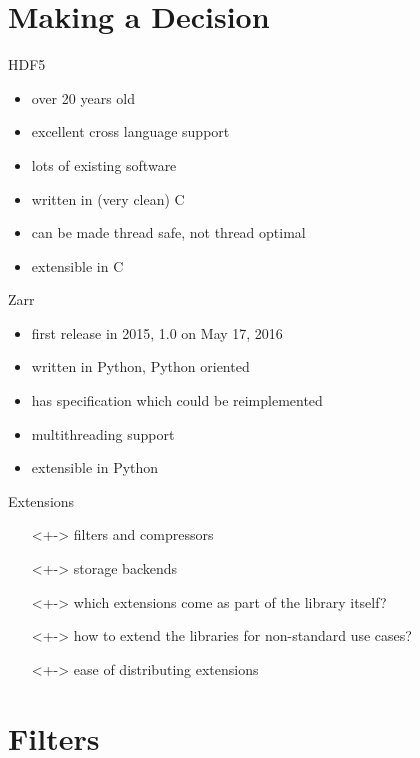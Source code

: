 \documentclass{beamer}
\begin{document}
\section{Making a Decision}

\begin{frame}{HDF5}
  \begin{itemize}
  \item<+-> over 20 years old
  \item<+-> excellent cross language support
  \item<+-> lots of existing software
  \item<+-> written in (very clean) C
  \item<+-> can be made thread safe, not thread optimal
  \item<+-> extensible in C
  \end{itemize}
\end{frame}

\begin{frame}{Zarr}
  \begin{itemize}
  \item<+-> first release in 2015, 1.0 on May 17, 2016
  \item<+-> written in Python, Python oriented
  \item<+-> has specification which could be reimplemented
  \item<+-> multithreading support
  \item<+-> extensible in Python
  \end{itemize}
\end{frame}

\begin{frame}{Extensions}
  \begin{itemize}
  \item[]<+-> filters and compressors
  \item[]<+-> storage backends
  \item[]<+-> which extensions come as part of the library itself?
  \item[]<+-> how to extend the libraries for non-standard use cases?
  \item[]<+-> ease of distributing extensions
  \end{itemize}
\end{frame}

\section{Filters}
\end{document}
